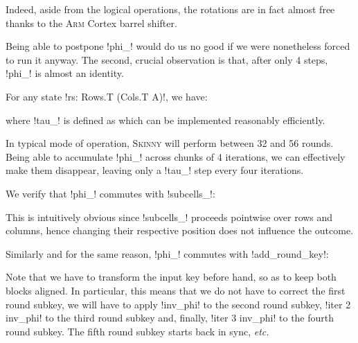 \documentclass[draft,english]{jflart}
\newcommand{\etc}{\textit{etc.}}
\newcommand{\Skinny}{\textsc{Skinny}}
\begin{document}
Indeed, aside from the logical operations, the rotations are in fact
almost free thanks to the \textsc{Arm} Cortex barrel
shifter.


Being able to postpone \coqe!phi_! would do us no good if we were
nonetheless forced to run it anyway. The second, crucial observation
is that, after only 4 steps, \coqe!phi_! is almost an identity.

\begin{prop}
  For any state \coqe!rs: Rows.T (Cols.T A)!, we have:

  where \coqe!tau_! is defined as
  which can be implemented reasonably efficiently.
\end{prop}

In typical mode of operation, \Skinny{} will perform between 32 and 56
rounds. Being able to accumulate \coqe!phi_! across chunks of 4
iterations, we can effectively make them disappear, leaving only a
\coqe!tau_! step every four iterations.


We verify that \coqe!phi_! commutes with \coqe!subcells_!:
%
\begin{prop}
\end{prop}

This is intuitively obvious since \coqe!subcells_! proceeds pointwise
over rows and columns, hence changing their respective position does
not influence the outcome.


Similarly and for the same reason, \coqe!phi_! commutes with
\coqe!add_round_key!:
%
\begin{prop}
\end{prop}

Note that we have to transform the input key before hand, so as to
keep both blocks aligned. In particular, this means that we do not
have to correct the first round subkey, we will have to apply
\coqe!inv_phi! to the second round subkey, \coqe!iter 2 inv_phi! to
the third round subkey and, finally, \coqe!iter 3 inv_phi! to the
fourth round subkey. The fifth round subkey starts back in sync,
\etc{}
\end{document}
